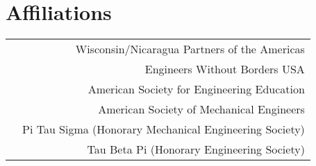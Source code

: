 \section*{Affiliations}
\begin{tabular}{L!{\VRule}R}
&Wisconsin/Nicaragua Partners of the Americas\\
&Engineers Without Borders USA\\
&American Society for Engineering Education\\
&American Society of Mechanical Engineers\\
&Pi Tau Sigma (Honorary Mechanical Engineering Society)\\
&Tau Beta Pi (Honorary Engineering Society)\\
\end{tabular}